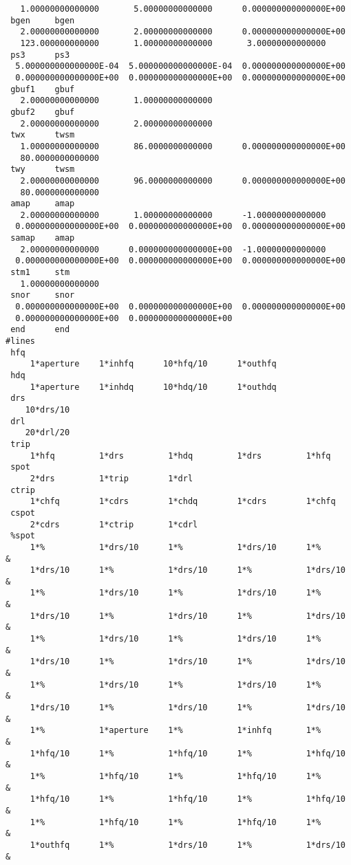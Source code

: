 \begin{footnotesize}
\begin{verbatim}
   1.00000000000000       5.00000000000000      0.000000000000000E+00
 bgen     bgen
   2.00000000000000       2.00000000000000      0.000000000000000E+00
   123.000000000000       1.00000000000000       3.00000000000000
 ps3      ps3
  5.000000000000000E-04  5.000000000000000E-04  0.000000000000000E+00
  0.000000000000000E+00  0.000000000000000E+00  0.000000000000000E+00
 gbuf1    gbuf
   2.00000000000000       1.00000000000000
 gbuf2    gbuf
   2.00000000000000       2.00000000000000
 twx      twsm
   1.00000000000000       86.0000000000000      0.000000000000000E+00
   80.0000000000000
 twy      twsm
   2.00000000000000       96.0000000000000      0.000000000000000E+00
   80.0000000000000
 amap     amap
   2.00000000000000       1.00000000000000      -1.00000000000000
  0.000000000000000E+00  0.000000000000000E+00  0.000000000000000E+00
 samap    amap
   2.00000000000000      0.000000000000000E+00  -1.00000000000000
  0.000000000000000E+00  0.000000000000000E+00  0.000000000000000E+00
 stm1     stm
   1.00000000000000
 snor     snor
  0.000000000000000E+00  0.000000000000000E+00  0.000000000000000E+00
  0.000000000000000E+00  0.000000000000000E+00
 end      end
#lines
 hfq
     1*aperture    1*inhfq      10*hfq/10      1*outhfq
 hdq
     1*aperture    1*inhdq      10*hdq/10      1*outhdq
 drs
    10*drs/10
 drl
    20*drl/20
 trip
     1*hfq         1*drs         1*hdq         1*drs         1*hfq
 spot
     2*drs         1*trip        1*drl
 ctrip
     1*chfq        1*cdrs        1*chdq        1*cdrs        1*chfq
 cspot
     2*cdrs        1*ctrip       1*cdrl
 %spot
     1*%           1*drs/10      1*%           1*drs/10      1*%        &
     1*drs/10      1*%           1*drs/10      1*%           1*drs/10   &
     1*%           1*drs/10      1*%           1*drs/10      1*%        &
     1*drs/10      1*%           1*drs/10      1*%           1*drs/10   &
     1*%           1*drs/10      1*%           1*drs/10      1*%        &
     1*drs/10      1*%           1*drs/10      1*%           1*drs/10   &
     1*%           1*drs/10      1*%           1*drs/10      1*%        &
     1*drs/10      1*%           1*drs/10      1*%           1*drs/10   &
     1*%           1*aperture    1*%           1*inhfq       1*%        &
     1*hfq/10      1*%           1*hfq/10      1*%           1*hfq/10   &
     1*%           1*hfq/10      1*%           1*hfq/10      1*%        &
     1*hfq/10      1*%           1*hfq/10      1*%           1*hfq/10   &
     1*%           1*hfq/10      1*%           1*hfq/10      1*%        &
     1*outhfq      1*%           1*drs/10      1*%           1*drs/10   &

\end{verbatim}
\end{footnotesize}
